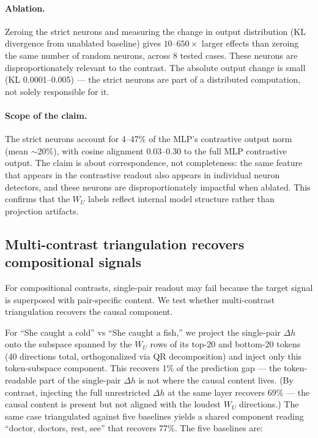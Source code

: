 \documentclass[11pt]{article}
\newcommand{\dhh}{\Delta h}
\newcommand{\WU}{W_U}
\begin{document}
\paragraph{Ablation.} Zeroing the strict neurons and measuring the change in output
distribution (KL divergence from unablated baseline) gives $10$--$650\times$ larger
effects than zeroing the same number of random neurons, across 8 tested
cases. These neurons are disproportionately relevant to the contrast. The
absolute output change is small (KL 0.0001--0.005) --- the strict neurons are
part of a distributed computation, not solely responsible for it.

\paragraph{Scope of the claim.} The strict neurons account for 4--47\% of the MLP's
contrastive output norm (mean $\sim$20\%), with cosine alignment 0.03--0.30 to the
full MLP contrastive output. The claim is about correspondence, not completeness:
the same feature that appears in the contrastive readout also appears in
individual neuron detectors, and these neurons are disproportionately
impactful when ablated. This confirms that the
$\WU$ labels reflect internal model structure rather than projection artifacts.

\subsection{Multi-contrast triangulation recovers compositional signals}

For compositional contrasts, single-pair readout may fail because the
target signal is superposed with pair-specific content. We test whether
multi-contrast triangulation recovers the causal component.

For ``She caught a cold'' vs ``She caught a fish,'' we project the single-pair
$\dhh$ onto the subspace spanned by the $\WU$ rows of its top-20 and bottom-20
tokens (40 directions total, orthogonalized via QR decomposition) and
inject only this token-subspace component. This recovers 1\% of the
prediction gap --- the token-readable part of the single-pair $\dhh$ is not
where the causal content lives. (By contrast, injecting the full
unrestricted $\dhh$ at the same layer recovers 69\% --- the causal content is
present but not aligned with the loudest $\WU$ directions.) The same case
triangulated against five baselines yields a shared component reading
``doctor, doctors, rest, see'' that recovers 77\%. The five baselines are:
\end{document}
